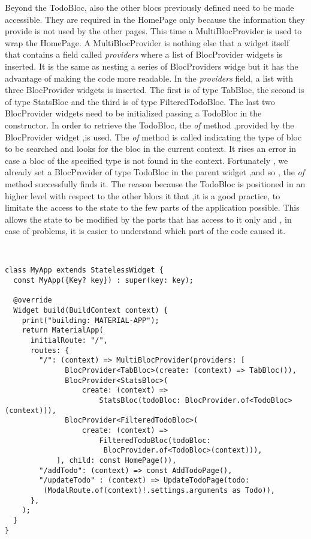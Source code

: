 Beyond the TodoBloc, also the other blocs previously defined need to be made accessible. They are required in the HomePage only because the information they provide is not used by the other pages. This time a MultiBlocProvider is used to wrap the HomePage.  A MultiBlocProvider is nothing else that a widget itself that contains a field called \textit{providers} where a list of BlocProvider widgets is inserted.  It is the same as nesting a series of BlocProviders widge but it has the advantage of making the code more readable. In the \textit{providers} field, a list with three BlocProvider widgets is inserted. The first is of type TabBloc, the second is of type StatsBloc and the third is of type FilteredTodoBloc. The last two BlocProvider widgets need to be initialized passing a TodoBloc in the constructor. In order to retrieve the TodoBloc, the \textit{of }method ,provided by the BlocProvider widget ,is used. The \textit{of} method is called indicating the type of bloc to be searched and looks for the bloc in the current context. It rises an error in case a bloc of the specified type is not found in the context. Fortunately , we already set a BlocProvider of type TodoBloc in the parent widget ,and so , the \textit{of} method successfully finds it. The reason because the TodoBloc is positioned in an higher level with respect to the other blocs it that ,it is a good practice, to limitate the access to the state to the few parts of the application possible. This allows the state to be modified by the parts that has access to it only and , in case of problems, it is easier to  understand which part of the code caused it.
\begin{code}
\mbox{}\\
 \mbox{}
\label{code:2.14}
\begin{verbatim}
class MyApp extends StatelessWidget {
  const MyApp({Key? key}) : super(key: key);

  @override
  Widget build(BuildContext context) {
    print("building: MATERIAL-APP");
    return MaterialApp(
      initialRoute: "/",
      routes: {
        "/": (context) => MultiBlocProvider(providers: [
              BlocProvider<TabBloc>(create: (context) => TabBloc()),
              BlocProvider<StatsBloc>(
                  create: (context) =>
                      StatsBloc(todoBloc: BlocProvider.of<TodoBloc>(context))),
              BlocProvider<FilteredTodoBloc>(
                  create: (context) =>
                      FilteredTodoBloc(todoBloc:
                       BlocProvider.of<TodoBloc>(context))),
            ], child: const HomePage()),
        "/addTodo": (context) => const AddTodoPage(),
        "/updateTodo" : (context) => UpdateTodoPage(todo:
         (ModalRoute.of(context)!.settings.arguments as Todo)),
      },
    );
  }
}
\end{verbatim}
\mbox{}
\end{code}


